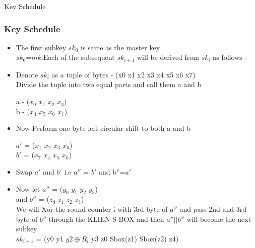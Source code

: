 \begin{frame}{Key Schedule}
\subsubsection{Key Schedule}

\begin{itemize}
	
	\item The first subkey $sk_{0}$ is same as the master key \\
	$sk_{0}$=$mk$.Each of the subsequent $sk_{i+1}$ will be derived from $sk_{i}$ as follows - \\
	
	\item Denote $sk_{i}$ as a tuple of bytes - (x0 x1 x2 x3 x4 x5 x6 x7) \\
	Divide the tuple into two equal parts and call them a and b 
	
	a - ($ x_{0}$ $x_{1}$ $x_{2}$ $x_{3}$) \\
	b - ($x_{4}$ $x_{5}$ $x_{6}$ $x_{7}$) \\
	
	\item Now Perform one byte left circular shift to both a and b
	
	$a'$ = ($x_{1}$ $x_{2}$ $x_{3}$ $x_{0}$) \\
	$b'$  = ($x_{7}$ $x_{4}$ $x_{5}$ $x_{6}$) \\
\end{itemize}
\end{frame}
\begin{frame}
\begin{itemize}

	\item Swap $a'$ and $b'$  i.e $a''$ = $b'$  and b''=$a'$ \\
	
	\item Now let $a''$ = ($y_{0}$ $y_{1}$ $y_{2}$ $y_{3}$) \\
	and $b''$ = ($z_{0}$ $z_{1}$ $z_{2}$ $z_{3}$) \\
	
	We will Xor the round counter i with 3rd byte of $a''$ and pass 2nd and 3rd byte of $b''$ through the KLIEN S-BOX and then $a''$$||$$b''$ will become the next subkey \\
	$sk_{i+1}$ = (y0 y1 $ y2 \oplus R_i $ y3 z0 Sbox(z1) Sbox(z2) z4)\\
\end{itemize}
\end{frame}
